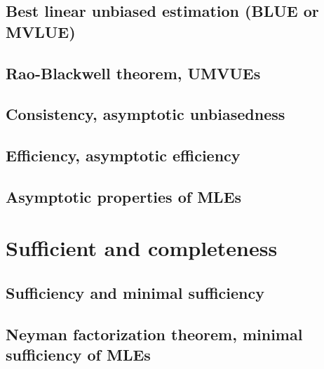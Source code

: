 \documentclass[
]{book}
\begin{document}
\hypertarget{best-linear-unbiased-estimation-blue-or-mvlue}{%
\subsection{Best linear unbiased estimation (BLUE or MVLUE)}\label{best-linear-unbiased-estimation-blue-or-mvlue}}

\hypertarget{rao-blackwell-theorem-umvues}{%
\subsection{Rao-Blackwell theorem, UMVUEs}\label{rao-blackwell-theorem-umvues}}

\hypertarget{consistency-asymptotic-unbiasedness}{%
\subsection{Consistency, asymptotic unbiasedness}\label{consistency-asymptotic-unbiasedness}}

\hypertarget{efficiency-asymptotic-efficiency}{%
\subsection{Efficiency, asymptotic efficiency}\label{efficiency-asymptotic-efficiency}}

\hypertarget{asymptotic-properties-of-mles}{%
\subsection{Asymptotic properties of MLEs}\label{asymptotic-properties-of-mles}}

\hypertarget{sufficient-and-completeness}{%
\section{Sufficient and completeness}\label{sufficient-and-completeness}}

\hypertarget{sufficiency-and-minimal-sufficiency}{%
\subsection{Sufficiency and minimal sufficiency}\label{sufficiency-and-minimal-sufficiency}}

\hypertarget{neyman-factorization-theorem-minimal-sufficiency-of-mles}{%
\subsection{Neyman factorization theorem, minimal sufficiency of MLEs}\label{neyman-factorization-theorem-minimal-sufficiency-of-mles}}
\end{document}
